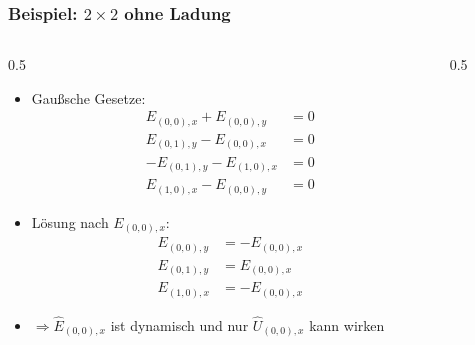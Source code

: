 \documentclass{beamer}
\begin{document}
\begin{frame}
	\frametitle{Beispiel: $2\times2$ ohne Ladung}
	\begin{columns}
		\begin{column}{0.5\textwidth}
			\begin{itemize}
				\item Gaußsche Gesetze:
				      \begin{align*}
					      E_{(0, 0), x}+E_{(0,0), y}   & =0 \\
					      E_{(0, 1), y}-E_{(0, 0), x}  & =0 \\
					      -E_{(0, 1), y}-E_{(1, 0), x} & =0 \\
					      E_{(1, 0), x}-E_{(0,0), y}   & =0
				      \end{align*}
				\item Lösung nach $E_{(0, 0), x}$:
				      \begin{align*}
					      E_{(0, 0), y} & =-E_{(0, 0), x} \\
					      E_{(0, 1), y} & =E_{(0, 0), x}  \\
					      E_{(1, 0), x} & =-E_{(0, 0), x}
				      \end{align*}
				\item $\Rightarrow \hat{E}_{(0, 0), x}$ ist dynamisch und nur $\hat{U}_{(0, 0), x}$ kann wirken
			\end{itemize}
		\end{column}
		\begin{column}{0.5\textwidth}
			
		\end{column}
	\end{columns}

\end{frame}
\end{document}
